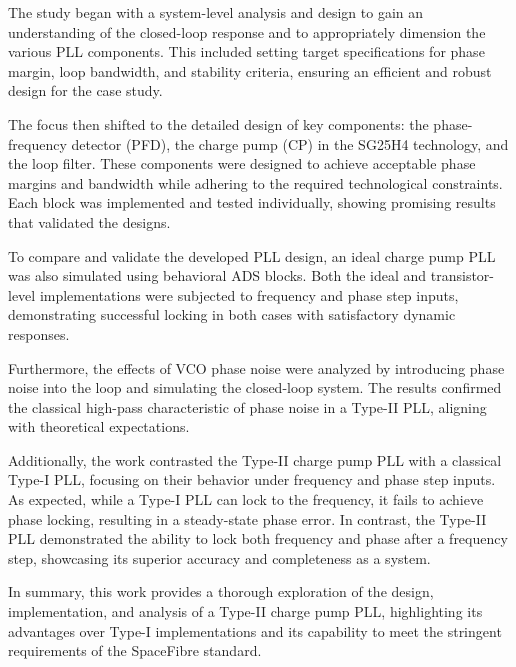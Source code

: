 \documentclass[lettersize,journal]{IEEEtran}
\begin{document}
The study began with a system-level analysis and design to gain an understanding of the closed-loop response and to appropriately dimension the various PLL components. This included setting target specifications for phase margin, loop bandwidth, and stability criteria, ensuring an efficient and robust design for the case study.

The focus then shifted to the detailed design of key components: the phase-frequency detector (PFD), the charge pump (CP) in the SG25H4 technology, and the loop filter. These components were designed to achieve acceptable phase margins and bandwidth while adhering to the required technological constraints. Each block was implemented and tested individually, showing promising results that validated the designs.

To compare and validate the developed PLL design, an ideal charge pump PLL was also simulated using behavioral ADS blocks. Both the ideal and transistor-level implementations were subjected to frequency and phase step inputs, demonstrating successful locking in both cases with satisfactory dynamic responses.

Furthermore, the effects of VCO phase noise were analyzed by introducing phase noise into the loop and simulating the closed-loop system. The results confirmed the classical high-pass characteristic of phase noise in a Type-II PLL, aligning with theoretical expectations. 

Additionally, the work contrasted the Type-II charge pump PLL with a classical Type-I PLL, focusing on their behavior under frequency and phase step inputs. As expected, while a Type-I PLL can lock to the frequency, it fails to achieve phase locking, resulting in a steady-state phase error. In contrast, the Type-II PLL demonstrated the ability to lock both frequency and phase after a frequency step, showcasing its superior accuracy and completeness as a system.

In summary, this work provides a thorough exploration of the design, implementation, and analysis of a Type-II charge pump PLL, highlighting its advantages over Type-I implementations and its capability to meet the stringent requirements of the SpaceFibre standard.

\printbibliography
\end{document}
